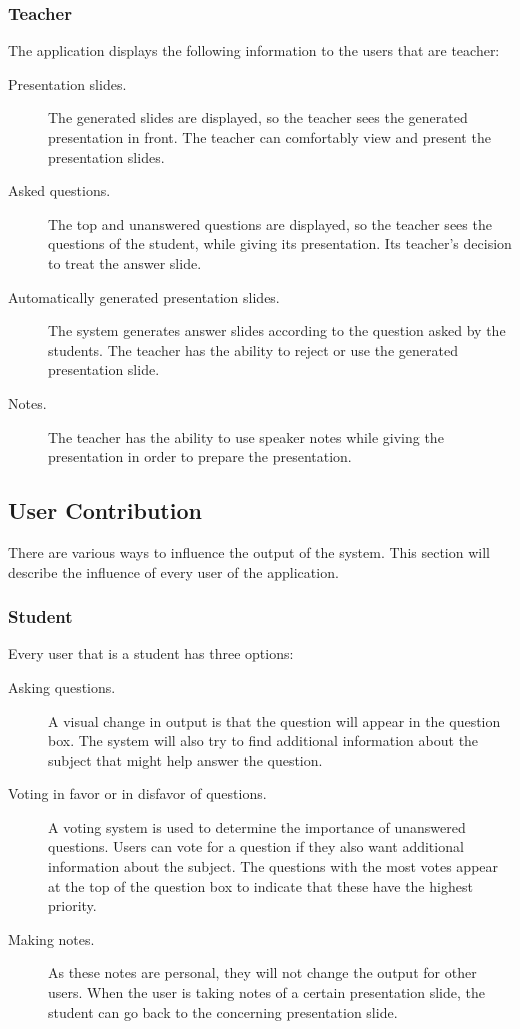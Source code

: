 \documentclass[11pt]{article}
\begin{document}
\subsubsection{Teacher}
The application displays the following information to the users that are teacher:
\begin{description}
\item[Presentation slides.] The generated slides are displayed, so the teacher sees the generated presentation in front. The teacher can comfortably view and present the presentation slides.
\item[Asked questions.] The top and unanswered questions are displayed, so the teacher sees the questions of the student, while giving its presentation. Its teacher’s decision to treat the answer slide. 
\item[Automatically generated presentation slides.] The system generates answer slides according to the question asked by the students. The teacher has the ability to reject or use the generated presentation slide.
\item[Notes.] The teacher has the ability to use speaker notes while giving the presentation in order to prepare the presentation.
\end{description}

\subsection{User Contribution}
There are various ways to influence the output of the system. This section will describe the influence of every user of the application.
\subsubsection{Student}
Every user that is a student has three options:
\begin{description}
\item[Asking questions.] A visual change in output is that the question will appear in the question box. The system will also try to find additional information about the subject that might help answer the question.
\item[Voting in favor or in disfavor of questions.] A voting system is used to determine the importance of unanswered questions. Users can vote for a question if they also want additional information about the subject. The questions with the most votes appear at the top of the question box to indicate that these have the highest priority.
\item[Making notes.] As these notes are personal, they will not change the output for other users. When the user is taking notes of a certain presentation slide, the student can go back to the concerning presentation slide.
\end{description}
\end{document}
